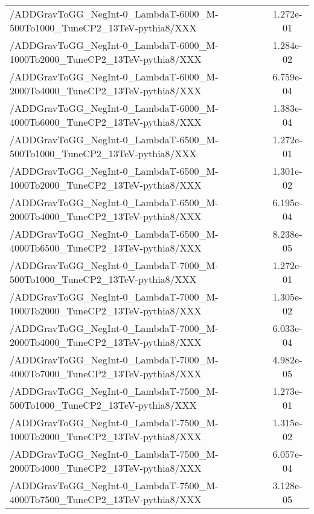 \begin{landscape}
\begin{table}[!htbp]
\begin{tabular}{lc}
/ADDGravToGG\_NegInt-0\_LambdaT-6000\_M-500To1000\_TuneCP2\_13TeV-pythia8/XXX &  1.272e-01\\
/ADDGravToGG\_NegInt-0\_LambdaT-6000\_M-1000To2000\_TuneCP2\_13TeV-pythia8/XXX &  1.284e-02\\
/ADDGravToGG\_NegInt-0\_LambdaT-6000\_M-2000To4000\_TuneCP2\_13TeV-pythia8/XXX &  6.759e-04\\
/ADDGravToGG\_NegInt-0\_LambdaT-6000\_M-4000To6000\_TuneCP2\_13TeV-pythia8/XXX &  1.383e-04\\
/ADDGravToGG\_NegInt-0\_LambdaT-6500\_M-500To1000\_TuneCP2\_13TeV-pythia8/XXX &  1.272e-01\\
/ADDGravToGG\_NegInt-0\_LambdaT-6500\_M-1000To2000\_TuneCP2\_13TeV-pythia8/XXX &  1.301e-02\\
/ADDGravToGG\_NegInt-0\_LambdaT-6500\_M-2000To4000\_TuneCP2\_13TeV-pythia8/XXX &  6.195e-04\\
/ADDGravToGG\_NegInt-0\_LambdaT-6500\_M-4000To6500\_TuneCP2\_13TeV-pythia8/XXX &  8.238e-05\\
/ADDGravToGG\_NegInt-0\_LambdaT-7000\_M-500To1000\_TuneCP2\_13TeV-pythia8/XXX &  1.272e-01\\
/ADDGravToGG\_NegInt-0\_LambdaT-7000\_M-1000To2000\_TuneCP2\_13TeV-pythia8/XXX &  1.305e-02\\
/ADDGravToGG\_NegInt-0\_LambdaT-7000\_M-2000To4000\_TuneCP2\_13TeV-pythia8/XXX &  6.033e-04\\
/ADDGravToGG\_NegInt-0\_LambdaT-7000\_M-4000To7000\_TuneCP2\_13TeV-pythia8/XXX &  4.982e-05\\
/ADDGravToGG\_NegInt-0\_LambdaT-7500\_M-500To1000\_TuneCP2\_13TeV-pythia8/XXX &  1.273e-01\\
/ADDGravToGG\_NegInt-0\_LambdaT-7500\_M-1000To2000\_TuneCP2\_13TeV-pythia8/XXX &  1.315e-02\\
/ADDGravToGG\_NegInt-0\_LambdaT-7500\_M-2000To4000\_TuneCP2\_13TeV-pythia8/XXX &  6.057e-04\\
/ADDGravToGG\_NegInt-0\_LambdaT-7500\_M-4000To7500\_TuneCP2\_13TeV-pythia8/XXX &  3.128e-05\\

       \hline \hline
       \end{tabular}
       \label{table:ADD_signal_samples_xsec}
\end{table}
\end{landscape}


